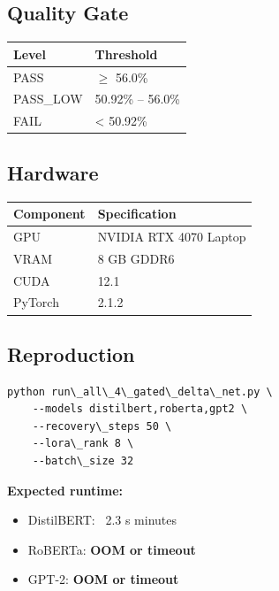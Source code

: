 \subsection{Quality Gate}

\begin{table}[H]
\centering
\small
\begin{tabular}{ll}
\toprule
\textbf{Level} & \textbf{Threshold} \\
\midrule
PASS & $\ge$ 56.0\% \\
PASS\_LOW & 50.92\% -- 56.0\% \\
FAIL & \textless{} 50.92\% \\
\bottomrule
\end{tabular}
\end{table}

\subsection{Hardware}

\begin{table}[H]
\centering
\small
\begin{tabular}{ll}
\toprule
\textbf{Component} & \textbf{Specification} \\
\midrule
GPU & NVIDIA RTX 4070 Laptop \\
VRAM & 8 GB GDDR6 \\
CUDA & 12.1 \\
PyTorch & 2.1.2 \\
\bottomrule
\end{tabular}
\end{table}

\subsection{Reproduction}

\begin{lstlisting}
python run\_all\_4\_gated\_delta\_net.py \
    --models distilbert,roberta,gpt2 \
    --recovery\_steps 50 \
    --lora\_rank 8 \
    --batch\_size 32
\end{lstlisting}

\textbf{Expected runtime:}
\begin{itemize}
\item DistilBERT: ~2.3 s minutes
\item RoBERTa: \textbf{OOM or timeout}
\item GPT-2: \textbf{OOM or timeout}

\end{itemize}
